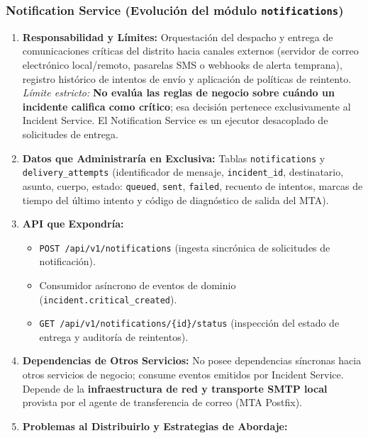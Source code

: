 \documentclass[10pt,a4paper]{article}
\begin{document}
\subsubsection{Notification Service (Evolución del módulo \texttt{notifications})}

\begin{enumerate}[leftmargin=*]
    \item \textbf{Responsabilidad y Límites:} Orquestación del despacho y entrega de comunicaciones críticas del distrito hacia canales externos (servidor de correo electrónico local/remoto, pasarelas SMS o webhooks de alerta temprana), registro histórico de intentos de envío y aplicación de políticas de reintento. \textit{Límite estricto:} \textbf{No evalúa las reglas de negocio sobre cuándo un incidente califica como crítico}; esa decisión pertenece exclusivamente al Incident Service. El Notification Service es un ejecutor desacoplado de solicitudes de entrega.
    \item \textbf{Datos que Administraría en Exclusiva:} Tablas \texttt{notifications} y \texttt{delivery\_attempts} (identificador de mensaje, \texttt{incident\_id}, destinatario, asunto, cuerpo, estado: \texttt{queued}, \texttt{sent}, \texttt{failed}, recuento de intentos, marcas de tiempo del último intento y código de diagnóstico de salida del MTA).
    \item \textbf{API que Expondría:}
    \begin{itemize}[leftmargin=*]
        \item \texttt{POST /api/v1/notifications} (ingesta sincrónica de solicitudes de notificación).
        \item Consumidor asíncrono de eventos de dominio (\texttt{incident.critical\_created}).
        \item \texttt{GET /api/v1/notifications/\{id\}/status} (inspección del estado de entrega y auditoría de reintentos).
    \end{itemize}
    \item \textbf{Dependencias de Otros Servicios:} No posee dependencias síncronas hacia otros servicios de negocio; consume eventos emitidos por Incident Service. Depende de la \textbf{infraestructura de red y transporte SMTP local} provista por el agente de transferencia de correo (MTA Postfix).
    \item \textbf{Problemas al Distribuirlo y Estrategias de Abordaje:}
    \begin{itemize}[leftmargin=*]

\end{itemize}
\end{enumerate}
\end{document}
